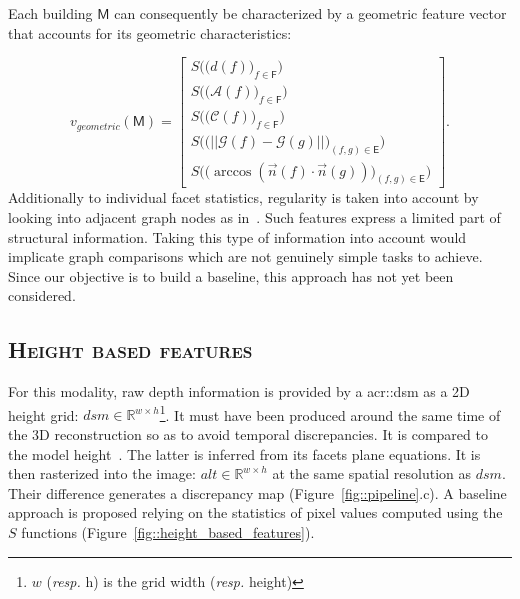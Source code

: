         Each building $\mathsf{M}$ can consequently be characterized by a geometric feature vector that accounts for its geometric characteristics:

        \begin{equation}
        	\label{eq::geom_feat}
            v_{geometric}(\mathsf{M}) = \begin{bmatrix}
            	S \Big(\big(d(f)\big)_{f \in \mathsf{F}}\Big)\\
                S \Big(\big(\mathscr{A}(f)\big)_{f \in \mathsf{F}}\Big)\\
                S \Big(\big(\mathscr{C}(f)\big)_{f \in \mathsf{F}}\Big)\\
                S \Big(\big( \vert\vert \mathscr{G}(f) - \mathscr{G}(g) \vert\vert \big)_{(f,g) \in \mathsf{E}}\Big)\\
                S\Big(\big( \arccos(\vec{n}(f) \cdot \vec{n}(g)) \big)_{(f,g) \in \mathsf{E}}\Big)
            \end{bmatrix}.
        \end{equation}
        Additionally to individual facet statistics, regularity is taken into account by looking into adjacent graph nodes as in~\parencite{zhou20102}.
        Such features express a limited  part of structural information.
        Taking this type of information into account would implicate graph comparisons which are not genuinely simple tasks to achieve.
        Since our objective is to build a baseline, this approach has not yet been considered.

    \subsection{\textsc{Height based features}}
        For this modality, raw depth information is provided by a \gls{acr::dsm} as a 2D height grid: $dsm \in \mathbb{R}^{w\times h}$\footnote{$w$ (\textit{resp.} h) is the grid width (\textit{resp.} height)}.
        It must have been produced around the same time of the 3D reconstruction so as to avoid temporal discrepancies.
        It is compared to the model height~\parencite{bredif20073d,zebedin2008fusion}.
        The latter is inferred from its facets plane equations.
        It is then rasterized into the image: $alt \in \mathbb{R}^{w\times h}$ at the same spatial resolution as $dsm$.
        Their difference generates a discrepancy map (Figure~\ref{fig::pipeline}.c).
        A baseline approach is proposed relying on the statistics of pixel values computed using the $S$ functions (Figure~\ref{fig::height_based_features}).

